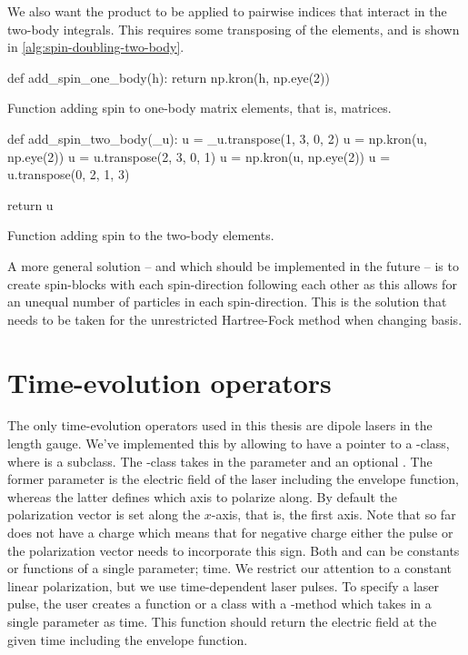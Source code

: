         We also want the product to be applied to pairwise indices that interact
        in the two-body integrals.
        This requires some transposing of the elements, and is shown in
        \autoref{alg:spin-doubling-two-body}.
        \begin{algorithm}
            \begin{python}
def add_spin_one_body(h):
    return np.kron(h, np.eye(2))
            \end{python}
            \caption{Function adding spin to one-body matrix elements, that is,
            matrices.}
            \label{alg:spin-doubling-one-body}
        \end{algorithm}
        \begin{algorithm}
            \begin{python}
def add_spin_two_body(_u):
    u = _u.transpose(1, 3, 0, 2)
    u = np.kron(u, np.eye(2))
    u = u.transpose(2, 3, 0, 1)
    u = np.kron(u, np.eye(2))
    u = u.transpose(0, 2, 1, 3)

    return u
            \end{python}
            \caption{Function adding spin to the two-body elements.}
            \label{alg:spin-doubling-two-body}
        \end{algorithm}

        A more general solution -- and which should be implemented in the future
        -- is to create spin-blocks with each spin-direction following each
        other as this allows for an unequal number of particles in each
        spin-direction.
        This is the solution that needs to be taken for the unrestricted
        Hartree-Fock method when changing basis.

    \section{Time-evolution operators}
        The only time-evolution operators used in this thesis are dipole lasers
        in the length gauge.
        We've implemented this by allowing  to have a
        pointer to a -class, where 
        is a subclass.
        The -class takes in the parameter 
        and an optional .
        The former parameter is the electric field of the laser including the
        envelope function, whereas the latter defines which axis to polarize
        along.
        By default the polarization vector is set along the $x$-axis, that is,
        the first axis.
        Note that  so far does not have a charge which means
        that for negative charge either the pulse or the polarization vector
        needs to incorporate this sign.
        Both  and  can be constants
        or functions of a single parameter; time.
        We restrict our attention to a constant linear polarization, but we use
        time-dependent laser pulses.
        To specify a laser pulse, the user creates a function or a class with a
        -method which takes in a single parameter as time.
        This function should return the electric field at the given time
        including the envelope function.
